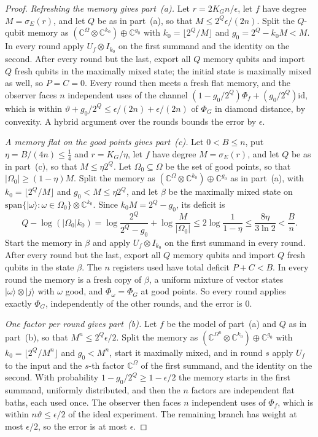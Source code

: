 \begin{proof}
\emph{Refreshing the memory gives part~(a).} Let $r=2K_Gn/\epsilon$, let $f$ have degree $M=\sigma_E(r)$, and let $Q$ be as in part~(a), so that
$M\le2^Q\epsilon/(2n)$. Split the $Q$-qubit memory as $(\mathbb C^\Omega\otimes\mathbb C^{k_0})\oplus\mathbb C^{g_0}$ with $k_0=\lfloor2^Q/M\rfloor$ and
$g_0=2^Q-k_0M<M$. In every round apply $U_f\otimes I_{k_0}$ on the first summand and the identity on the second. After every round but the
last, export all $Q$ memory qubits and import $Q$ fresh qubits in the maximally mixed state; the initial state is maximally mixed as well, so
$P=C=0$. Every round then meets a fresh flat memory, and the observer faces $n$ independent uses of the channel
$(1-g_0/2^Q)\Phi_f+(g_0/2^Q)\mathrm{id}$, which is within $\vartheta+g_0/2^Q\le\epsilon/(2n)+\epsilon/(2n)$ of $\Phi_G$ in diamond distance, by
convexity. A hybrid argument over the rounds bounds the error by $\epsilon$.

\emph{A memory flat on the good points gives part~(c).} Let $0<B\le n$, put $\eta=B/(4n)\le\frac14$ and $r=K_G/\eta$, let $f$ have degree
$M=\sigma_E(r)$, and let $Q$ be as in part~(c), so that $M\le\eta2^Q$. Let $\Omega_0\subseteq\Omega$ be the set of good points, so that
$|\Omega_0|\ge(1-\eta)M$. Split the memory as $(\mathbb C^\Omega\otimes\mathbb C^{k_0})\oplus\mathbb C^{g_0}$ as in part~(a), with
$k_0=\lfloor2^Q/M\rfloor$ and $g_0<M\le\eta2^Q$, and let $\beta$ be the maximally mixed state on
$\mathrm{span}\{|\omega\rangle:\omega\in\Omega_0\}\otimes\mathbb C^{k_0}$. Since $k_0M=2^Q-g_0$, its deficit is
\[
Q-\log(|\Omega_0|k_0)=\log\frac{2^Q}{2^Q-g_0}+\log\frac M{|\Omega_0|}\le2\log\frac1{1-\eta}\le\frac{8\eta}{3\ln2}<\frac Bn .
\]
Start the memory in $\beta$ and apply $U_f\otimes I_{k_0}$ on the first summand in every round. After every round but the last, export all $Q$
memory qubits and import $Q$ fresh qubits in the state $\beta$. The $n$ registers used have total deficit $P+C<B$. In every round the memory is a
fresh copy of $\beta$, a uniform mixture of vector states $|\omega\rangle\otimes|j\rangle$ with $\omega$ good, and $\Phi_\omega=\Phi_G$ at good points.
So every round applies exactly $\Phi_G$, independently of the other rounds, and the error is $0$.

\emph{One factor per round gives part~(b).} Let $f$ be the model of part~(a) and $Q$ as in part~(b), so that $M^n\le2^Q\epsilon/2$. Split the
memory as $(\mathbb C^{\Omega^n}\otimes\mathbb C^{k_0})\oplus\mathbb C^{g_0}$ with $k_0=\lfloor2^Q/M^n\rfloor$ and $g_0<M^n$, start it maximally
mixed, and in round $s$ apply $U_f$ to the input and the $s$-th factor $\mathbb C^\Omega$ of the first summand, and the identity on the second.
With probability $1-g_0/2^Q\ge1-\epsilon/2$ the memory starts in the first summand, uniformly distributed, and then the $n$ factors are
independent flat baths, each used once. The observer then faces $n$ independent uses of $\Phi_f$, which is within $n\vartheta\le\epsilon/2$ of
the ideal experiment. The remaining branch has weight at most $\epsilon/2$, so the error is at most $\epsilon$.
\end{proof}

